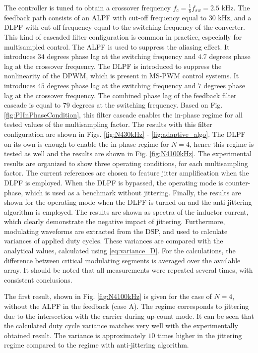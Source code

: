 \documentclass[journal]{IEEEtran}
\begin{document}
The controller is tuned to obtain a crossover frequency $f_{c} = \frac{1}{8} f_{sw} = 2.5$ kHz. 
The feedback path consists of an ALPF with cut-off frequency equal to $30$ kHz, and a DLPF with cut-off frequency equal to the switching frequency of the converter. This kind of cascaded filter configuration is common in practice, especially for multisampled control. The ALPF is used to suppress the aliasing effect. It introduces $34$ degrees phase lag at the switching frequency and $4.7$ degrees phase lag at the crossover frequency. The DLPF is introduced to suppress the nonlinearity of the DPWM, which is present in MS-PWM control systems. It introduces $45$ degrees phase lag at the switching frequency and $7$ degrees phase lag at the crossover frequency. The combined phase lag of the feedback filter cascade is equal to $79$ degrees at the switching frequency. Based on Fig. \ref{fig:PIInPhaseCondition}, this filter cascade enables the in-phase regime for all tested values of the multisampling factor. The results with this filter configuration are shown in Figs. \ref{fig:N430kHz} - \ref{fig:adaptive_algo}. The DLPF on its own is enough to enable the in-phase regime for $N = 4$, hence this regime is tested as well and the results are shown in Fig. \ref{fig:N4100kHz}.
The experimental results are organized to show three operating conditions, for each multisampling factor. The current references are chosen to feature jitter amplification when the DLPF is employed. When the DLPF is bypassed, the operating mode is counter-phase, which is used as a benchmark without jittering. Finally, the results are shown for the operating mode when the DLPF is turned on and the anti-jittering algorithm is employed.
The results are shown as spectra of the inductor current, which clearly demonstrate the negative impact of jittering. Furthermore, modulating waveforms are extracted from the DSP, and used to calculate variances of applied duty cycles. These variances are compared with the analytical values, calculated using \eqref{eq:variance_D}. For the calculations, the difference between critical modulating segments is averaged over the available array. It should be noted that all measurements were repeated several times, with consistent conclusions.

The first result, shown in Fig. \ref{fig:N4100kHz} is given for the case of $N=4$, without the ALPF in the feedback (case A). The regime corresponds to jittering due to the intersection with the carrier during up-count mode. It can be seen that the calculated duty cycle variance matches very well with the experimentally obtained result. The variance is approximately $10$ times higher in the jittering regime compared to the regime with anti-jittering algorithm.
\end{document}
